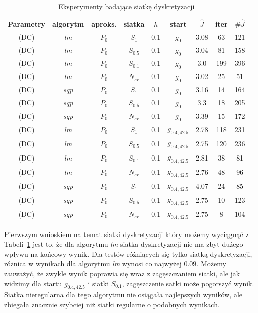 \documentclass[11pt]{article}
\begin{document}
\begin{table}[h!]
  \begin{center}
    \begin{tabular}{|c|c|c|c|c|c|c|c|c|}
      \hline
      Parametry & algorytm & aproks. & siatka & $h$ & start & $\hat{J}$ & iter & $\#\hat{J}$ \\
      \hline
      (DC) & {\it lm\/} & $P_0$ & $S_1$ & 0.1 & $g_0$ & 3.08 & 63 & 121 \\
      \hline
      (DC) & {\it lm\/} & $P_0$ & $S_{0.5}$ & 0.1 & $g_0$ & 3.04 & 81 & 158 \\
      \hline
      (DC) & {\it lm\/} & $P_0$ & $S_{0.1}$ & 0.1 & $g_0$ & 3.0 & 199 & 396 \\
      \hline
      (DC) & {\it lm\/} & $P_0$ & $N_{sr}$ & 0.1 & $g_0$ & 3.02 & 25 & 51 \\
      \hline
      (DC) & {\it sqp\/} & $P_0$ & $S_1$ & 0.1 & $g_0$ & 3.16 & 14 & 164 \\
      \hline
      (DC) & {\it sqp\/} & $P_0$ & $S_{0.5}$ & 0.1 & $g_0$ & 3.3 & 18 & 205 \\
      \hline
      (DC) & {\it sqp\/} & $P_0$ & $N_{sr}$ & 0.1 & $g_0$ & 3.39 & 15 & 172 \\
      \hline
      (DC) & {\it lm\/} & $P_0$ & $S_1$ & 0.1 & $g_{0.4,42.5}$ & 2.78 & 118 & 231 \\
      \hline
      (DC) & {\it lm\/} & $P_0$ & $S_{0.5}$ & 0.1 & $g_{0.4,42.5}$ & 2.75 & 120 & 236 \\
      \hline
      (DC) & {\it lm\/} & $P_0$ & $S_{0.1}$ & 0.1 & $g_{0.4,42.5}$ & 2.81 & 38 & 81 \\
      \hline
      (DC) & {\it lm\/} & $P_0$ & $N_{sr}$ & 0.1 & $g_{0.4,42.5}$ & 2.76 & 48 & 96 \\
      \hline
      (DC) & {\it sqp\/} & $P_0$ & $S_1$ & 0.1 & $g_{0.4,42.5}$ & 4.07 & 24 & 85 \\
      \hline
      (DC) & {\it sqp\/} & $P_0$ & $S_{0.5}$ & 0.1 & $g_{0.4,42.5}$ & 2.75 & 10 & 123 \\
      \hline
      (DC) & {\it sqp\/} & $P_0$ & $N_{sr}$ & 0.1 & $g_{0.4,42.5}$ & 2.75 & 8 & 104 \\
      \hline
    \end{tabular}
    \caption{Eksperymenty badające siatkę dyskretyzacji}\label{grid_tbl}
  \end{center}
\end{table}

Pierwszym wnioskiem na temat siatki dyskretyzacji który możemy wyciągnąć z Tabeli~\ref{grid_tbl} jest to, że dla algorytmu {\it lm\/} siatka dyskretyzacji nie ma zbyt dużego wpływu na końcowy wynik. Dla testów różniących się tylko siatką dyskretyzacji, różnica w wynikach dla algorytmu {\it lm\/} wynosi co najwyżej $0.09$. Możemy zauważyć, że zwykle wynik poprawia się wraz z zagęszczaniem siatki, ale jak widzimy dla startu $g_{0.4,42.5}$ i siatki $S_{0.1}$, zagęszczenie satki może pogorszyć wynik. Siatka nieregularna dla tego algorytmu nie osiągała najlepszych wyników, ale zbiegała znacznie szybciej niż siatki regularne o podobnych wynikach.
\end{document}
